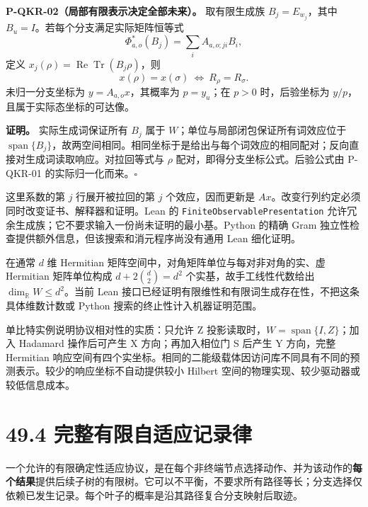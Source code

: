 \documentclass[
  11pt,
  oneside]{book}
\begin{document}
\protect\hypertarget{p-qkr-02}{}{}

\textbf{P-QKR-02（局部有限表示决定全部未来）。} 取有限生成族
\(B_j=E_{w_j}\)，其中 \(B_u=I\)。若每个分支满足实际矩阵恒等式 \[
\Phi_{a,o}^*(B_j)=\sum_i A_{a,o;ji}B_i,
\] 定义 \(x_j(\rho)=\operatorname{Re}\operatorname{Tr}(B_j\rho)\)，则 \[
x(\rho)=x(\sigma)\ \Longleftrightarrow\ R_\rho=R_\sigma.
\] 未归一分支坐标为 \(y=A_{a,o}x\)，其概率为 \(p=y_u\)；在 \(p>0\)
时，后验坐标为 \(y/p\)，且属于实际态坐标的可达像。

\textbf{证明。} 实际生成词保证所有 \(B_j\) 属于
\(W\)；单位与局部闭包保证所有词效应位于
\(\operatorname{span}\{B_j\}\)，故两空间相同。相同坐标于是给出与每个词效应的相同配对；反向直接对生成词读取响应。对拉回等式与
\(\rho\) 配对，即得分支坐标公式。后验公式由 P-QKR-01
的实际归一化而来。\(\square\)

这里系数的第 \(j\) 行展开被拉回的第 \(j\) 个效应，因而更新是
\(Ax\)。改变行列约定必须同时改变证书、解释器和证明。Lean 的
\texttt{FiniteObservablePresentation}
允许冗余生成族；它不要求输入一份尚未证明的最小基。Python 的精确 Gram
独立性检查提供额外信息，但该搜索和消元程序尚没有通用 Lean 细化证明。

在通常 \(d\) 维 Hermitian 矩阵空间中，对角矩阵单位与每对非对角的实、虚
Hermitian 矩阵单位构成 \(d+2\binom d2=d^2\) 个实基，故手工线性代数给出
\(\dim_{\mathbb R}W\le d^2\)。当前 Lean
接口已经证明有限维性和有限词生成存在性，不把这条具体维数计数或 Python
搜索的终止性计入机器证明范围。

单比特实例说明协议相对性的实质：只允许 Z
投影读取时，\(W=\operatorname{span}\{I,Z\}\)；加入 Hadamard 操作后可产生
X 方向；再加入相位门 S 后产生 Y 方向，完整 Hermitian
响应空间有四个实坐标。相同的二能级载体因访问库不同具有不同的预测表示。较少的响应坐标不自动提供较小
Hilbert 空间的物理实现、较少驱动器或较低信息成本。

\hypertarget{ux5b8cux6574ux6709ux9650ux81eaux9002ux5e94ux8bb0ux5f55ux5f8b}{%
\section{49.4
完整有限自适应记录律}\label{ux5b8cux6574ux6709ux9650ux81eaux9002ux5e94ux8bb0ux5f55ux5f8b}}

一个允许的有限确定性适应协议，是在每个非终端节点选择动作、并为该动作的\textbf{每个结果}提供后续子树的有限树。它可以不平衡，不要求所有路径等长；分支选择仅依赖已发生记录。每个叶子的概率是沿其路径复合分支映射后取迹。

\protect\hypertarget{p-qkr-03}{}{}
\end{document}
